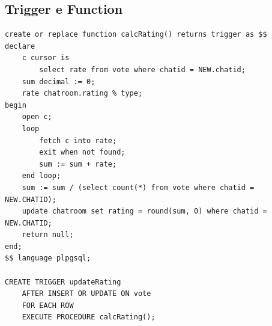 \documentclass[a4paper, 12pt]{article}
\begin{document}
\subsection{Trigger e Function}
\begin{verbatim}
create or replace function calcRating() returns trigger as $$
declare
    c cursor is
        select rate from vote where chatid = NEW.chatid;
    sum decimal := 0;
    rate chatroom.rating % type;
begin
    open c;
    loop
        fetch c into rate;
        exit when not found;
        sum := sum + rate;
    end loop;
    sum := sum / (select count(*) from vote where chatid = NEW.CHATID);
    update chatroom set rating = round(sum, 0) where chatid = NEW.CHATID;
    return null;
end;
$$ language plpgsql;

CREATE TRIGGER updateRating
    AFTER INSERT OR UPDATE ON vote
    FOR EACH ROW
    EXECUTE PROCEDURE calcRating();

\end{verbatim}
\end{document}
